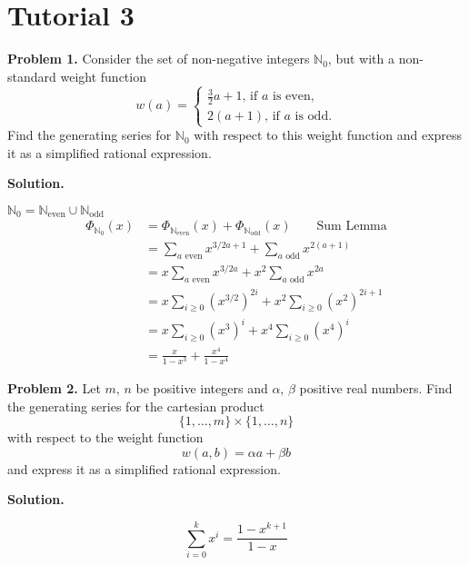 \section{Tutorial 3}
\textbf{Problem 1.} Consider the set of non-negative integers
$ \mathbb{N}_0 $, but with a non-standard weight function
\[ w(a)=
    \begin{cases}
        \frac{3}{2} a + 1,\,\text{if $a$ is even}, \\
        2(a+1),\,\text{if $a$ is odd.}
    \end{cases} \]
Find the generating series for $ \mathbb{N}_0 $ with respect to this weight
function and express it as a simplified rational expression.

\textbf{Solution.}

$ \mathbb{N}_0=\mathbb{N}_{\text{even}}\cup\mathbb{N}_{\text{odd}} $
\begin{align*}
    \Phi_{\mathbb{N}_0}(x)
     & =\Phi_{\mathbb{N}_{\text{even}}}(x)+\Phi_{\mathbb{N}_{\text{odd}}}(x)\qquad\text{Sum Lemma} \\
     & =\sum\limits_{a \text{ even}}x^{3/2a+1}+\sum\limits_{a \text{ odd}}x^{2(a+1)}               \\
     & =x \sum\limits_{a \text{ even}}x^{3/2a}+x^2\sum\limits_{a \text{ odd}}x^{2a}                \\
     & =x \sum\limits_{i\ge 0} (x^{3/2})^{2i}+x^2\sum\limits_{i \ge 0} (x^{2})^{2i+1}              \\
     & =x \sum\limits_{i\ge 0} (x^3)^i + x^4 \sum\limits_{i\ge 0} (x^4)^i                          \\
     & =\frac{x}{1-x^3} + \frac{x^4}{1-x^4}
\end{align*}

\textbf{Problem 2.} Let $ m,\,n $ be positive integers and $ \alpha,\,\beta $
positive real numbers. Find the generating series for the cartesian product
\[ \{1,\ldots ,m\}\times \{1,\ldots ,n\} \]
with respect to the weight function
\[ w(a,b)=\alpha a+ \beta b \]
and express it as a simplified rational expression.

\textbf{Solution.}

\begin{thmbox}
    \begin{theorem}
        \[ \sum\limits_{i=0}^{k} x^i=\frac{1-x^{k+1}}{1-x} \]
    \end{theorem}
\end{thmbox}

